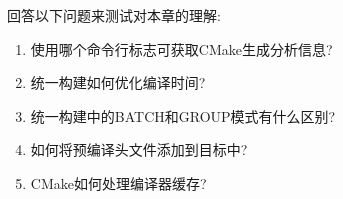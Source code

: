 回答以下问题来测试对本章的理解:

\begin{enumerate}
\item 
使用哪个命令行标志可获取CMake生成分析信息?

\item 
统一构建如何优化编译时间?

\item 
统一构建中的BATCH和GROUP模式有什么区别?

\item 
如何将预编译头文件添加到目标中?

\item 
CMake如何处理编译器缓存?
\end{enumerate}